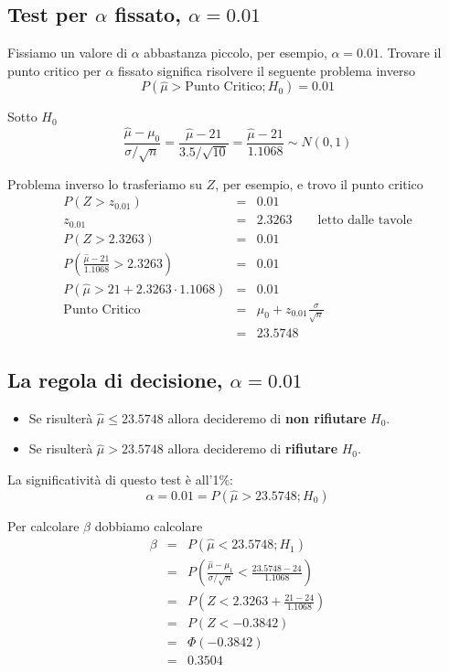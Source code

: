\documentclass[
  11pt,
]{book}
\providecommand{\tightlist}{%
  \setlength{\itemsep}{0pt}\setlength{\parskip}{0pt}}
\theoremstyle{mytheoremstyle}
\theoremstyle{mydefstyle}
\begin{document}
\subsection{\texorpdfstring{Test per \(\alpha\) fissato, \(\alpha=0.01\)}{Test per \textbackslash alpha fissato, \textbackslash alpha=0.01}}\label{test-per-alpha-fissato-alpha0.01}

Fissiamo un valore di \(\alpha\) abbastanza piccolo, per esempio, \(\alpha=0.01\).
Trovare il punto critico per \(\alpha\) fissato significa risolvere il seguente problema inverso
\[P(\hat\mu>\text{Punto Critico};H_0)=0.01\]

Sotto \(H_0\)
\[\frac{\hat\mu-\mu_0}{\sigma/\sqrt n}=\frac{\hat\mu-21}{3.5/\sqrt{10}}=\frac{\hat\mu-21}{1.1068}\sim N(0,1)\]

Problema inverso lo trasferiamo su \(Z\), per esempio, e trovo il punto critico
\begin{eqnarray*}
P(Z>z_{0.01}) &=& 0.01 \\
z_{0.01} &=& 2.3263 \qquad \text{letto dalle tavole}\\
P(Z>2.3263) &=& 0.01 \\
P\left(\frac{\hat\mu-21}{1.1068}>2.3263\right)&=&0.01\\
P\left(\hat\mu>21+2.3263\cdot1.1068\right)&=&0.01\\
\text{Punto Critico} &=& \mu_0+z_{0.01}\frac{\sigma}{\sqrt{n}} \\
                     &=& 23.5748
\end{eqnarray*}

\subsection{\texorpdfstring{La regola di decisione, \(\alpha=0.01\)}{La regola di decisione, \textbackslash alpha=0.01}}\label{la-regola-di-decisione-alpha0.01}

\begin{itemize}
\tightlist
\item
  Se risulterà \(\hat\mu\leq 23.5748\) allora decideremo di \textbf{non rifiutare} \(H_0\).
\item
  Se risulterà \(\hat\mu>23.5748\) allora decideremo di \textbf{rifiutare} \(H_0\).
\end{itemize}

La significatività di questo test è all'1\%:
\[\alpha=0.01=P(\hat\mu>23.5748;H_0)\]

Per calcolare \(\beta\) dobbiamo calcolare
\begin{eqnarray*}
  \beta &=& P(\hat\mu<23.5748;H_1) \\
  &=&      P\left(\frac{\hat\mu-\mu_1}{\sigma/\sqrt n}<\frac{23.5748-24}{1.1068}\right)\\
      &=& P\left(Z<2.3263+\frac{21-24}{1.1068}\right)\\
  &=&P(Z<-0.3842)\\
  &=&\Phi(-0.3842)\\
  &=&0.3504
\end{eqnarray*}
\end{document}
